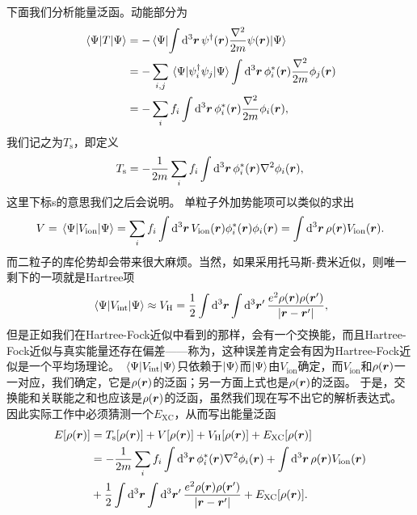 下面我们分析能量泛函。动能部分为
\[
    \begin{aligned}
        \mel{\Psi}{T}{\Psi} &= - \mel{\Psi}{\int \dd[3]{\vb*{r}} \psi^\dagger(\vb*{r}) \frac{\laplacian}{2m} \psi(\vb*{r})}{\Psi} \\
        &= - \sum_{i, j} \mel{\Psi}{\psi_i^\dagger \psi_j}{\Psi} \int \dd[3]{\vb*{r}} \phi^*_i(\vb*{r}) \frac{\laplacian}{2m} \phi_j(\vb*{r}) \\
        &= - \sum_i f_i \int \dd[3]{\vb*{r}} \phi^*_i(\vb*{r}) \frac{\laplacian}{2m} \phi_i(\vb*{r}),
    \end{aligned}
\]
我们记之为$T_\text{s}$，即定义
\begin{equation}
    T_\text{s} = - \frac{1}{2m} \sum_i f_i \int \dd[3]{\vb*{r}} \phi_i^*(\vb*{r}) \laplacian \phi_i(\vb*{r}),
\end{equation}
这里下标s的意思我们之后会说明。
单粒子外加势能项可以类似的求出
\begin{equation}
    V = \mel{\Psi}{{V}_\text{ion}}{\Psi} = \sum_i f_i \int \dd[3]{\vb*{r}} V_{\text{ion}}(\vb*{r}) \phi_i^*(\vb*{r}) \phi_i(\vb*{r}) = \int \dd[3]{\vb*{r}} \rho(\vb*{r}) V_\text{ion}(\vb*{r}).
\end{equation}
而二粒子的库伦势却会带来很大麻烦。当然，如果采用托马斯-费米近似，则唯一剩下的一项就是Hartree项
\begin{equation}
    \mel{\Psi}{{V}_\text{int}}{\Psi} \approx V_{\text{H}} = \frac{1}{2} \int \dd[3]{\vb*{r}} \int \dd[3]{\vb*{r}'} \frac{e^2 \rho(\vb*{r}) \rho(\vb*{r}')}{\abs{\vb*{r} - \vb*{r}'}},
    \label{eq:dft-hartree-term}
\end{equation}
但是正如我们在Hartree-Fock近似中看到的那样，会有一个交换能，而且Hartree-Fock近似与真实能量还存在偏差——称为，这种误差肯定会有因为Hartree-Fock近似是一个平均场理论。
$\mel{\Psi}{{V}_\text{int}}{\Psi}$只依赖于$\ket{\Psi}$而$\ket{\Psi}$由$V_\text{ion}$确定，而$V_\text{ion}$和$\rho(\vb*{r})$一一对应，我们确定，它是$\rho(\vb*{r})$的泛函；另一方面上式也是$\rho(\vb*{r})$的泛函。
于是，交换能和关联能之和也应该是$\rho(\vb*{r})$的泛函，虽然我们现在写不出它的解析表达式。
因此实际工作中必须猜测一个$E_\text{XC}$，从而写出能量泛函
\begin{equation}
    \begin{aligned}
        E[\rho(\vb*{r})] &= T_\text{s}[\rho(\vb*{r})] + V[\rho(\vb*{r})] + V_\text{H}[\rho(\vb*{r})] + E_\text{XC} [\rho(\vb*{r})] \\
        &= - \frac{1}{2m} \sum_i f_i \int \dd[3]{\vb*{r}} \phi_i^*(\vb*{r}) \laplacian \phi_i(\vb*{r})
        + \int \dd[3]{\vb*{r}} \rho(\vb*{r}) V_\text{ion}(\vb*{r}) \\
        &+ \frac{1}{2} \int \dd[3]{\vb*{r}} \int \dd[3]{\vb*{r}'} \frac{e^2 \rho(\vb*{r}) \rho(\vb*{r}')}{\abs{\vb*{r} - \vb*{r}'}} + E_\text{XC} [\rho(\vb*{r})].
    \end{aligned}
    \label{eq:kohn-sham-functional}
\end{equation}
